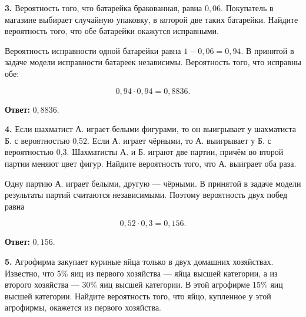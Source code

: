 \begin{task}\label{task-problems-3}
\textbf{3.} Вероятность того, что батарейка бракованная, равна $0{,}06$. Покупатель в магазине выбирает случайную упаковку, в которой две таких батарейки. Найдите вероятность того, что обе батарейки окажутся исправными.
\end{task}

\begin{solution}\label{solution-problem-solving-practice-problems-3}
Вероятность исправности одной батарейки равна $1-0{,}06=0{,}94$. В принятой в задаче модели исправности батареек независимы. Вероятность того, что исправны обе:

\[0{,}94\cdot0{,}94=0{,}8836.\]

\textbf{Ответ:} $0{,}8836$.
\end{solution}

\begin{task}\label{task-problems-4}
\textbf{4.} Если шахматист А. играет белыми фигурами, то он выигрывает у шахматиста Б. с вероятностью 0,52. Если А. играет чёрными, то А. выигрывает у Б. с вероятностью 0,3. Шахматисты А. и Б. играют две партии, причём во второй партии меняют цвет фигур. Найдите вероятность того, что А. выиграет оба раза.
\end{task}

\begin{solution}\label{solution-problem-solving-practice-problems-4}
Одну партию А. играет белыми, другую — чёрными. В принятой в задаче модели результаты партий считаются независимыми. Поэтому вероятность двух побед равна

\[0{,}52\cdot0{,}3=0{,}156.\]

\textbf{Ответ:} $0{,}156$.
\end{solution}

\begin{task}\label{task-problems-5}
\textbf{5.} Агрофирма закупает куриные яйца только в двух домашних хозяйствах. Известно, что 5\% яиц из первого хозяйства  —  яйца высшей категории, а из второго хозяйства  —  30\% яиц высшей категории. В этой агрофирме 15\% яиц высшей категории. Найдите вероятность того, что яйцо, купленное у этой агрофирмы, окажется из первого хозяйства.
\end{task}


